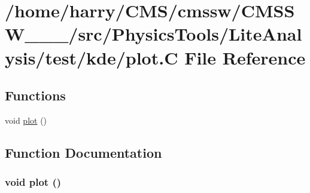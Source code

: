 \hypertarget{plot_8C}{
\section{/home/harry/CMS/cmssw/CMSSW\_\_\_/src/Physics\-Tools/Lite\-Analysis/test/kde/plot.C File Reference}
\label{plot_8C}
}


\subsection*{Functions}
\begin{CompactItemize}
\item 
void \hyperlink{plot_8C_a0}{plot} ()
\end{CompactItemize}


\subsection{Function Documentation}
\hypertarget{plot_8C_a0}{
\subsubsection[plot]{\setlength{\rightskip}{0pt plus 5cm}void plot ()}}
\label{plot_8C_a0}


